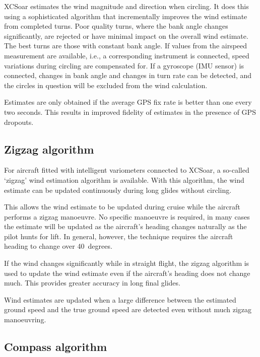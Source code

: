 XCSoar estimates the wind magnitude and direction when circling.  It
does this using a sophisticated algorithm that incrementally improves
the wind estimate from completed turns.  Poor quality turns, where
the bank angle changes significantly, are rejected or have minimal
impact on the overall wind estimate.  The best turns are those with
constant bank angle.
If values from the airspeed measurement are available, i.e., a
corresponding instrument is connected,
speed variations during circling are compensated for.
If a gyroscope (IMU sensor) is connected, changes in bank angle and
changes in turn rate can be detected, and the circles in question
will be excluded from the wind calculation.

Estimates are only obtained if the average GPS fix rate is better than
one every two seconds.  This results in improved fidelity of estimates
in the presence of GPS dropouts.


\subsection*{Zigzag algorithm}

For aircraft fitted with intelligent variometers connected to XCSoar,
a so-called `zigzag' wind estimation algorithm is available.  With
this algorithm, the wind estimate can be updated continuously during
long glides without circling.

This allows the wind estimate to be updated during cruise while the
aircraft performs a zigzag manoeuvre.  No specific manoeuvre is
required, in many cases the estimate will be updated as the aircraft's
heading changes naturally as the pilot hunts for lift.  In general,
however, the technique requires the aircraft heading to change over 40~degrees.

If the wind changes significantly while in straight flight, the
zigzag algorithm is used to update the wind estimate even if the
aircraft's heading does not change much. This provides greater
accuracy in long final glides.

Wind estimates are updated when a large difference between the
estimated ground speed and the true ground speed are detected even
without much zigzag manoeuvring.

\subsection*{Compass algorithm}


